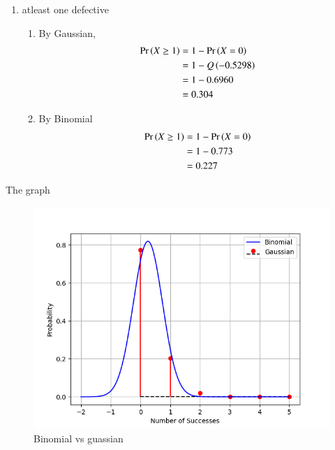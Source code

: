 \documentclass[article]{IEEEtran}
\theoremstyle{remark}
\begin{document}
\begin{enumerate}
\begin{enumerate}
	\end{enumerate}
	\item atleast one defective\\
	\begin{enumerate}
		\item By Gaussian,\\
		\begin{align}
			\Pr\left(X \geq 1\right) &= 1 -\Pr\left(X = 0\right)\\
			&= 1 - Q\left(-0.5298\right)\\
			&= 1 - 0.6960\\
			&= 0.304
		\end{align}
		\item By Binomial
		\begin{align}
			\Pr\left(X \geq 1\right) &= 1 -\Pr\left(X = 0\right)\\
			&= 1 - 0.773\\
			&= 0.227
		\end{align}	
	\end{enumerate}
\end{enumerate}
The graph\\
\begin{figure}[H]
\includegraphics[width=\columnwidth]{./figs/bg.png}
\caption{Binomial vs guassian}
\label{fig:BvG_py}
\end{figure}
\end{document}

